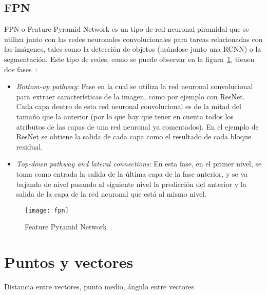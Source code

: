\subsection{FPN}
FPN o Feature Pyramid Network es un tipo de red neuronal piramidal que se utiliza junto con las redes neuronales convolucionales para tareas relacionadas con las imágenes, tales como la detección de objetos (usándose junto una RCNN) o la segmentación. Este tipo de redes, como se puede observar en la figura~\ref{fig:fpn}, tienen dos fases~\cite{fpn}:
\begin{itemize}
	\item \textit{Bottom-up pathway}: Fase en la cual se utiliza la red neuronal convolucional para extraer características de la imagen, como por ejemplo con ResNet. Cada capa dentro de esta red neuronal convolucional es de la mitad del tamaño que la anterior (por lo que hay que tener en cuenta todos los atributos de las capas de una red neuronal ya comentados). En el ejemplo de ResNet se obtiene la salida de cada capa como el resultado de cada bloque residual.
	\item \textit{Top-down pathway and lateral connections}: En esta fase, en el primer nivel, se toma como entrada la salida de la última capa de la fase anterior, y se va bajando de nivel pasando al siguiente nivel la predicción del anterior y la salida de la capa de la red neuronal que está al mismo nivel.
\end{itemize}
\begin{figure}[h]
	\centering
	\texttt{[image: fpn]}
	\caption{Feature Pyramid Network~\cite{fpn}.}
	\label{fig:fpn}
\end{figure}

\section{Puntos y vectores}
Distancia entre vectores, punto medio, ángulo entre vectores
